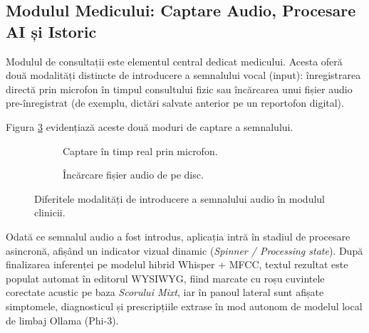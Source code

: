 \subsection{Modulul Medicului: Captare Audio, Procesare AI și Istoric}
Modulul de consultații este elementul central dedicat medicului. Acesta oferă două modalități distincte de introducere a semnalului vocal (input): înregistrarea directă prin microfon în timpul consultului fizic sau încărcarea unui fișier audio pre-înregistrat (de exemplu, dictări salvate anterior pe un reportofon digital).

Figura \ref{fig:audio_inputs} evidențiază aceste două moduri de captare a semnalului.

\begin{figure}[H]
    \centering
    \begin{subfigure}[b]{0.49\textwidth}
        \centering
        \color{red}
        \caption{Captare în timp real prin microfon.}
        \label{fig:screenshot_input_mic}
    \end{subfigure}
    \hfill
    \begin{subfigure}[b]{0.49\textwidth}
        \centering
        \color{red}
        \caption{Încărcare fișier audio de pe disc.}
        \label{fig:screenshot_input_file}
    \end{subfigure}
    \caption{Diferitele modalități de introducere a semnalului audio în modulul clinicii.}
    \label{fig:audio_inputs}
\end{figure}

Odată ce semnalul audio a fost introdus, aplicația intră în stadiul de procesare asincronă, afișând un indicator vizual dinamic (\textit{Spinner / Processing state}). După finalizarea inferenței pe modelul hibrid Whisper + MFCC, textul rezultat este populat automat în editorul WYSIWYG, fiind marcate cu roșu cuvintele corectate acustic pe baza \textit{Scorului Mixt}, iar în panoul lateral sunt afișate simptomele, diagnosticul și prescripțiile extrase în mod autonom de modelul local de limbaj Ollama (Phi-3).

